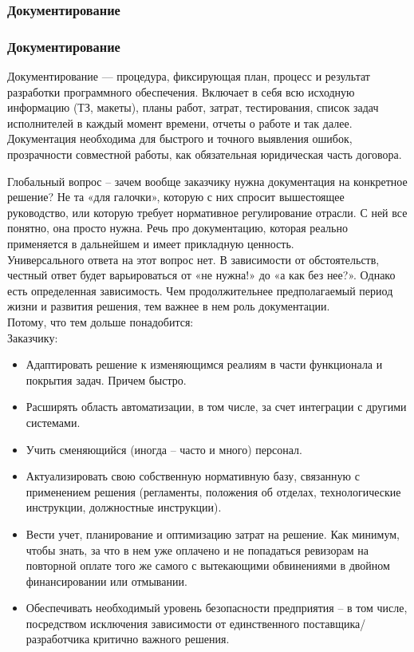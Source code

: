 \documentclass{../industrial-development}
\begin{document}
\subsubsection{Документирование}
\begin{frame} \frametitle{Документирование}
Документирование --- процедура, фиксирующая план, процесс и результат разработки программного обеспечения. Включает в себя всю исходную информацию (ТЗ, макеты), планы работ, затрат, тестирования, список задач исполнителей в каждый момент времени, отчеты о работе и так далее. Документация необходима для быстрого и точного выявления ошибок, прозрачности совместной работы, как обязательная юридическая часть договора.
\end{frame}
\lecturenotes
Глобальный вопрос – зачем вообще заказчику нужна документация на конкретное решение? Не та «для галочки», которую с них спросит вышестоящее руководство, или которую требует нормативное регулирование отрасли. С ней все понятно, она просто нужна. Речь про документацию, которая реально применяется в дальнейшем и имеет прикладную ценность.\\
Универсального ответа на этот вопрос нет. В зависимости от обстоятельств, честный ответ будет варьироваться от «не нужна!» до «а как без нее?». Однако есть определенная зависимость. Чем продолжительнее предполагаемый период жизни и развития решения, тем важнее в нем роль документации. \\
Потому, что тем дольше понадобится:\\
Заказчику:\\
\begin{itemize}
\item Адаптировать решение к изменяющимся реалиям в части функционала и покрытия задач. Причем быстро.
\item Расширять область автоматизации, в том числе, за счет интеграции с другими системами.
\item Учить сменяющийся (иногда – часто и много) персонал.
\item Актуализировать свою собственную нормативную базу, связанную с применением решения (регламенты, положения об отделах, технологические инструкции, должностные инструкции).
\item Вести учет, планирование и оптимизацию затрат на решение. Как минимум, чтобы знать, за что в нем уже оплачено и не попадаться ревизорам на повторной оплате того же самого с вытекающими обвинениями в двойном финансировании или отмывании.
\item Обеспечивать необходимый уровень безопасности предприятия – в том числе, посредством исключения зависимости от единственного поставщика/разработчика критично важного решения.
\end{itemize}\\
\end{document}

